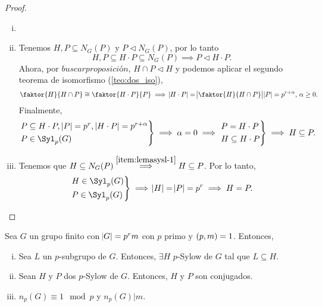 \begin{proof}
    \begin{enumerate}[i)]
        \item[]
        \item Tenemos $H, P \subseteq N_G(P)$ y $P \triangleleft N_G(P)$, por lo tanto
            \[
                H, P \subseteq H \cdot P \subseteq N_G(P) \implies P \triangleleft H \cdot P.
            \]
            Ahora, por $buscar proposición$, $H \cap P \triangleleft H$ y podemos aplicar el segundo teorema
            de isomorfismo (\ref{teo:dos_iso}),
            \[
                \faktor{H}{H \cap P} \cong \faktor{H \cdot P}{P} \implies \abs{H\cdot P} =
                \abs{\faktor{H}{H \cap P}} \abs{P} = p^{r + \alpha},\, \alpha \geq 0.
            \]
            Finalmente,
            \[
                \begin{rcases}
                    P\subseteq H\cdot P,\, \abs{P} = p^r,\, \abs{H\cdot P} = p^{r+\alpha} \\
                    P \in \Syl_p(G)
                \end{rcases}
                \implies \alpha = 0 \implies
                \begin{rcases}
                    P = H\cdot P \\
                    H \subseteq H\cdot P
                \end{rcases}
                \implies H\subseteq P.
            \]
        \item Tenemos que $H \subseteq N_G(P) \stackrel{\ref{item:lemasysl-1}}{\implies} H\subseteq P$. Por lo tanto,
            \[
                \begin{rcases}
                    H\in \Syl_p(G) \\
                    P\in \Syl_p(G)
                \end{rcases}
                \implies \abs{H} = \abs{P} = p^r \implies H = P.
            \]
    \end{enumerate}
\end{proof}

\begin{teo}\label{teo:stsyl}
    Sea $G$ un grupo finito con $\abs{G} = p^rm$ con $p$ primo y $\left( p, m\right) = 1$. Entonces,
    \begin{enumerate}[i)]
        \item \label{item:stsyl-1} Sea $L$ un $p$-subgrupo de $G$. Entonces, $\exists H$ $p$-Sylow de $G$ tal que $L \subseteq H$.
        \item \label{item:stsyl-2} Sean $H$ y $P$ dos $p$-Sylow de $G$. Entonces, $H$ y $P$ son conjugados.
        \item \label{item:stsyl-3} $n_p(G) \equiv 1 \mod p$ y $n_p(G) \vert m$.
    \end{enumerate}
\end{teo}

